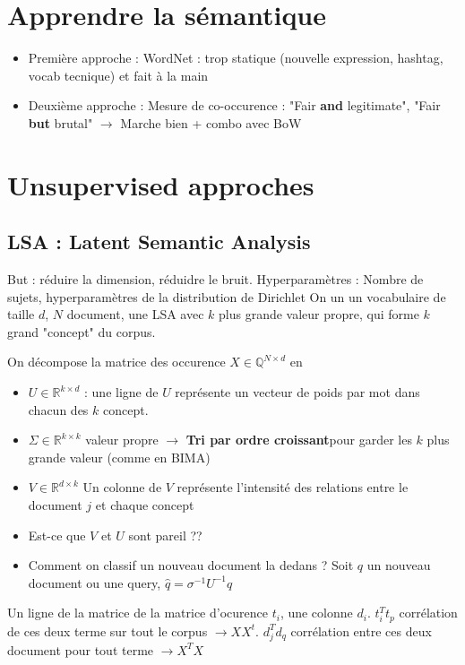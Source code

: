 \documentclass{article}
\theoremstyle{plain}%
\theoremstyle{definition}
\theoremstyle{remark}
\begin{document}
\section{Apprendre la sémantique}
\begin{itemize}
    \item Première approche : WordNet : trop statique (nouvelle expression, hashtag, vocab tecnique) et fait à la main 
    \item Deuxième approche : Mesure de co-occurence : "Fair \textbf{and} legitimate", "Fair \textbf{but} brutal" $\rightarrow$ Marche bien + combo avec BoW
\end{itemize}

\section{Unsupervised approches}
\subsection{LSA : Latent Semantic Analysis}
But : réduire la dimension, réduidre le bruit. Hyperparamètres : Nombre de sujets, hyperparamètres de la distribution de Dirichlet
On un un vocabulaire de taille $ d $, $ N $ document, une LSA avec $ k $ plus grande valeur propre, qui forme $ k $ grand "concept" du corpus.

On décompose la matrice des occurence $ X \in \mathbb{Q}^{N \times d}$ en \begin{itemize}
    \item $ U \in \mathbb{R}^{k \times d} $ : une ligne de $ U $ représente un vecteur de poids par mot dans chacun des $ k $ concept.
    \item $ \Sigma \in \mathbb{R}^{k \times k} $ valeur propre $\rightarrow$ \textbf{Tri par ordre croissant}pour garder les $k$ plus grande valeur (comme en BIMA)
    \item $ V \in \mathbb{R}^{d \times k} $ Un colonne de $ V $ représente l'intensité des relations entre le document $j$ et chaque concept
    \item Est-ce que $ V $ et $ U $ sont pareil ?? 
    \item Comment on classif un nouveau document la dedans ? Soit $ q $ un nouveau document ou une query, $ \hat{q} = \sigma ^{-1} U^{-1} q $ 
\end{itemize}
Un ligne de la matrice de la matrice d'ocurence $ t_i $, une colonne $ d_i $. $ t_i^T t_p $ corrélation de ces deux terme sur tout le corpus $\rightarrow X X^t$. $ d_j^T d_q $ corrélation entre ces deux document pour tout terme $\rightarrow X^T X$
\end{document}
